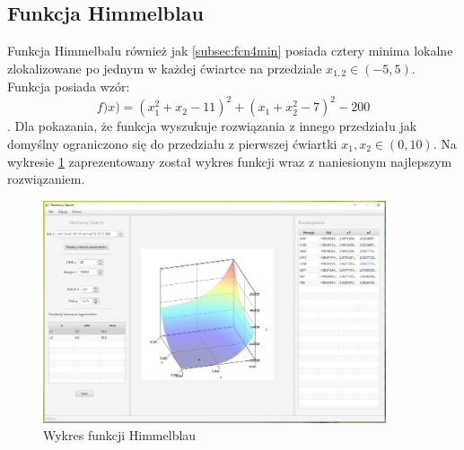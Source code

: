 \documentclass[10pt, a4paper]{article}
\begin{document}
\subsection{Funkcja Himmelblau}
\label{subsec:himmelblau}
Funkcja Himmelbalu również jak \ref{subsec:fcn4min} posiada cztery minima lokalne zlokalizowane po jednym w każdej ćwiartce na przedziale $x_{1,2} \in (-5,5)$. Funkcja posiada wzór: $$ f)x) = (x_{1}^{2}+x_{2}-11)^{2}+(x_{1}+x_{2}^{2}-7)^{2}-200$$. Dla pokazania, że funkcja wyszukuje rozwiązania z innego przedziału jak domyślny ograniczono się do przedziału z pierwszej ćwiartki $x_{1}, x_{2} \in (0,10)$. Na wykresie \ref{fig:5} zaprezentowany został wykres funkcji wraz z naniesionym najlepszym rozwiązaniem. 
\begin{figure}[htbp]
	\centering
	\includegraphics[width=0.90\textwidth]{images/4.PNG}
	\caption{Wykres funkcji Himmelblau}
	\label{fig:5}
\end{figure}
\end{document}
